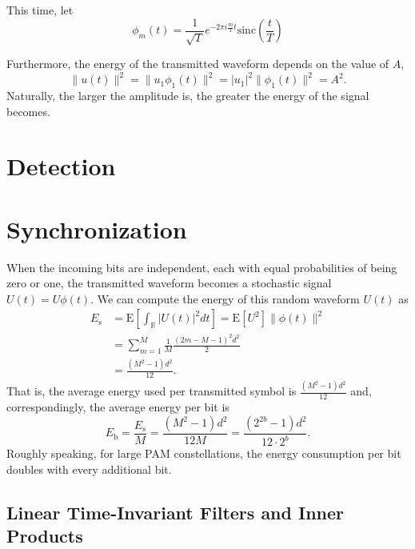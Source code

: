 \begin{example}
This time, let
\begin{equation*}
\phi_m(t) = \frac{1}{\sqrt{T}} e^{-2 \pi i \frac{m}{T} t} \mathrm{sinc} \left( \frac{t}{T} \right)
\end{equation*}
\end{example}



Furthermore, the energy of the transmitted waveform depends on the value of $A$,
\begin{equation*}
\| u(t) \|^2 = \| u_1 \phi_1 (t) \|^2 = |u_1|^2 \| \phi_1(t) \|^2 = A^2 .
\end{equation*}
Naturally, the larger the amplitude is, the greater the energy of the signal becomes.
\section{Detection}

\section{Synchronization}

When the incoming bits are independent, each with equal probabilities of being zero or one, the transmitted waveform becomes a stochastic signal $U(t) = U \phi(t)$.
We can compute the energy of this random waveform $U(t)$ as
\begin{equation*}
\begin{split}
E_{\mathrm{s}} &= \mathrm{E} \left[ \int_{\mathbb{R}} |U(t)|^2 dt \right]
= \mathrm{E} \left[ U^2 \right] \| \phi (t) \|^2 \\
&= \sum_{m=1}^M \frac{1}{M} \frac{(2m - M - 1)^2 d^2}{2} \\
&= \frac{\left( M^2 - 1 \right) d^2}{12} .
\end{split}
\end{equation*}
That is, the average energy used per transmitted symbol is $\frac{(M^2 - 1) d^2}{12}$ and, correspondingly, the average energy per bit is
\begin{equation*}
E_{\mathrm{b}} = \frac{ E_{\mathrm{s}} }{M}
= \frac{\left( M^2 - 1 \right) d^2}{12M}
= \frac{\left( 2^{2b} - 1 \right) d^2}{12 \cdot 2^b} .
\end{equation*}
Roughly speaking, for large PAM constellations, the energy consumption per bit doubles with every additional bit.


\subsection{Linear Time-Invariant Filters and Inner Products}

\fi

